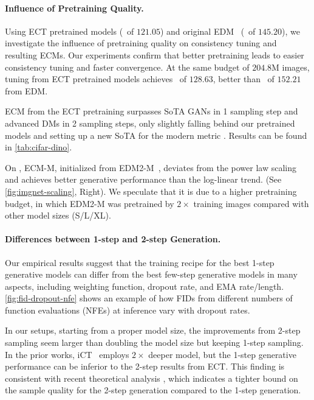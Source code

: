 \paragraph{Influence of Pretraining Quality.} Using ECT pretrained models (\dino\ of $121.05$) and original EDM~\citep{Karras2022edm} (\dino\ of $145.20$), we investigate the influence of pretraining quality on consistency tuning and resulting ECMs.
%
Our experiments confirm that better pretraining leads to easier consistency tuning and faster convergence.
At the same budget of $204.8\mathrm{M}$ images, tuning from ECT pretrained models achieves \dino\ of $128.63$, better than \dino\ of $152.21$ from EDM. 

ECM from the ECT pretraining surpasses SoTA GANs in 1 sampling step and advanced DMs in 2 sampling steps, only slightly falling behind our pretrained models and setting up a new SoTA for the modern metric \dino. Results can be found in \cref{tab:cifar-dino}. 

On \imgnet, ECM-M, initialized from EDM2-M~\citep{Karras2024edm2}, deviates from the power law scaling and achieves better generative performance than the log-linear trend. (See \cref{fig:imgnet-scaling}, Right). We speculate that it is due to a higher pretraining budget, in which EDM2-M was pretrained by $2\times$ training images compared with other model sizes (S/L/XL).

\paragraph{Differences between 1-step and 2-step Generation.}
%
Our empirical results suggest that the training recipe for the best 1-step generative models can differ from the best few-step generative models in many aspects, including weighting function, dropout rate, and EMA rate/length.
%
\cref{fig:fid-dropout-nfe} shows an example of how FIDs from different numbers of function evaluations (NFEs) at inference vary with dropout rates. 

In our setups, starting from a proper model size, the improvements from 2-step sampling seem larger than doubling the model size but keeping 1-step sampling.
In the prior works, iCT~\citep{ict} employs $2\times$ deeper model, but the 1-step generative performance can be inferior to the 2-step results from ECT. 
%
This finding is consistent with recent theoretical analysis \citep{lyu2023convergence}, which indicates a tighter bound on the sample quality for the 2-step generation compared to the 1-step generation. 

